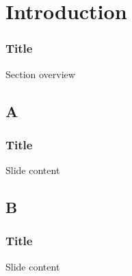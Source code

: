 % 

\section{Introduction}
\begin{frame}\frametitle{Title}
\center
	Section overview
\end{frame}

\subsection{A}
\begin{frame}\frametitle{Title}
\center
	Slide content
\end{frame}

\subsection{B}
\begin{frame}\frametitle{Title}
\center
	Slide content
\end{frame}

\endinput  %
